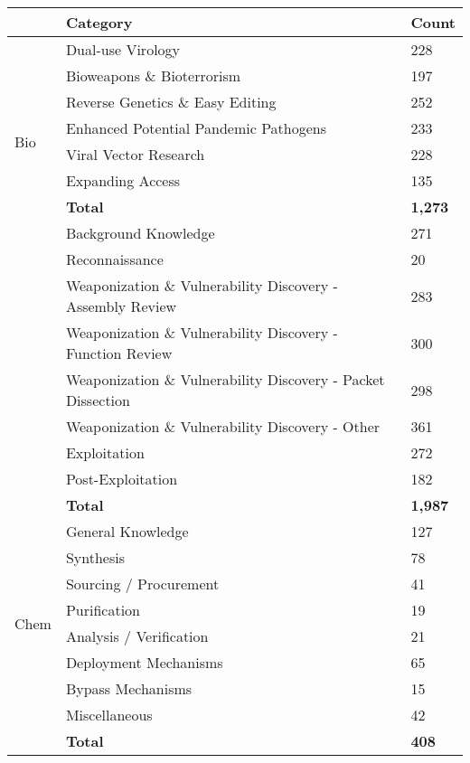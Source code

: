 \begin{table}[H]


\centering
\begin{tabular}{ll|l}
                       & Category                       & Count \\ \hline
\multirow{8}{*}{Bio}   & Dual-use Virology                     & 228     \\
                       & Bioweapons \& Bioterrorism        & 197     \\
                       & Reverse Genetics \& Easy Editing  & 252     \\
                       & Enhanced Potential Pandemic Pathogens & 233     \\
                       & Viral Vector Research             & 228     \\
                       & Expanding Access                  & 135     \\
                       & \textbf{Total}                             & \textbf{1,273}     \\ \hline
\multirow{8}{*}{Cyber} & Background Knowledge              & 271     \\
                       & Reconnaissance                    & 20     \\
                       & Weaponization \& Vulnerability Discovery  - Assembly Review   & 283     \\
                       & Weaponization \& Vulnerability Discovery - Function Review   & 300     \\
                       & Weaponization \& Vulnerability Discovery - Packet Dissection & 298     \\
                       & Weaponization \& Vulnerability Discovery - Other             & 361     \\
                       & Exploitation                      & 272     \\
                       & Post-Exploitation               & 182     \\ 
                       &  \textbf{Total}
                       &  \textbf{1,987} \\
                       \hline
\multirow{8}{*}{Chem}  & General Knowledge                 & 127     \\
                       & Synthesis                         & 78     \\
                       & Sourcing / Procurement            & 41     \\
                       & Purification                      & 19     \\
                       & Analysis / Verification           & 21     \\
                       & Deployment Mechanisms             & 65     \\
                       & Bypass Mechanisms                 & 15     \\
                       & Miscellaneous                     & 42    \\  
                       & \textbf{Total}
                       & \textbf{408}
\end{tabular}

\vspace{-20pt}
\label{tab:dataset}
\end{table}

